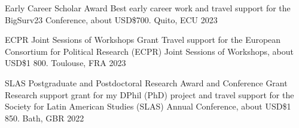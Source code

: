 






\vspace{1mm}

\begin{cvhonors}
\cvhonor
{Early Career Scholar Award}
{Best early career work and travel support for the BigSurv23 Conference, about USD\$700.} %
{Quito, ECU}
{2023}
\end{cvhonors}

\vspace{1mm}

\begin{cvhonors}
\cvhonor
{ECPR Joint Sessions of Workshops Grant}
{Travel support for the European Consortium for Political Research (ECPR) Joint Sessions of Workshops, about USD\$1 800.} %
{Toulouse, FRA}
{2023}
\end{cvhonors}

\vspace{1mm}




\begin{cvhonors}
\cvhonor
{SLAS Postgraduate and Postdoctoral Research Award and Conference Grant} 
{Research support grant for my DPhil (PhD) project and travel support for the Society for Latin American Studies (SLAS) Annual Conference, about USD\$1 850.} %
{Bath, GBR}
{2022}
\end{cvhonors}

\vspace{1mm}

